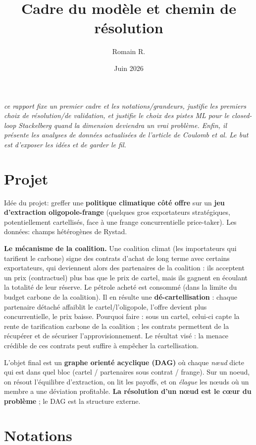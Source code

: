 \documentclass[11pt]{article}
\title{\vspace{-1.2cm}Cadre du modèle et chemin de résolution}
\author{Romain R.}
\date{Juin 2026}
\begin{document}
\maketitle
\vspace{-0.6cm}

\textit{ce rapport fixe un premier cadre et les notations/grandeurs, justifie les premiers choix de
résolution/de validation, et justifie le choix des pistes ML pour le closed-loop Stackelberg quand la dimension deviendra un vrai problème. Enfin, il présente les analyses de données actualisées de l'article de Coulomb et al. Le but est d'exposer les idées et de garder le fil. }

\section{Projet}

Idée du projet: greffer une \textbf{politique climatique côté offre} sur un \textbf{jeu d'extraction oligopole-frange} (quelques gros exportateurs stratégiques, potentiellement cartellisés, face à une frange concurrentielle price-taker). Les données: champs hétérogènes de Rystad.

\textbf{Le mécanisme de la coalition.} Une coalition climat (les importateurs qui tarifient le carbone) signe des contrats d'achat de long terme avec certains exportateurs, qui deviennent alors des partenaires de la coalition : ils acceptent un prix (contractuel) plus bas que le prix de cartel, mais ils gagnent en écoulant la totalité de leur réserve. Le pétrole acheté est consommé (dans la limite du budget carbone de la coalition). Il en résulte une \textbf{dé-cartellisation} : chaque partenaire détaché affaiblit le cartel/l'oligopole, l'offre devient plus concurrentielle, le prix baisse. Pourquoi faire : sous un cartel, celui-ci capte la rente de tarification carbone de la coalition ; les contrats permettent de la récupérer et de sécuriser l'approvisionnement. Le résultat visé : la menace crédible de ces contrats peut suffire à empêcher la cartellisation.


L'objet final est un \textbf{graphe orienté acyclique (DAG)} où chaque
\emph{n\oe ud} dicte qui est dans quel bloc (cartel / partenaires sous contrat / frange). Sur un noeud, on résout
l'équilibre d'extraction, on lit les payoffs, et on \emph{élague} les n\oe uds où un membre a une
déviation profitable. \textbf{La résolution d'un n\oe ud est le c\oe ur du problème} ; le DAG est la structure externe. 

\section{Notations}
\end{document}
